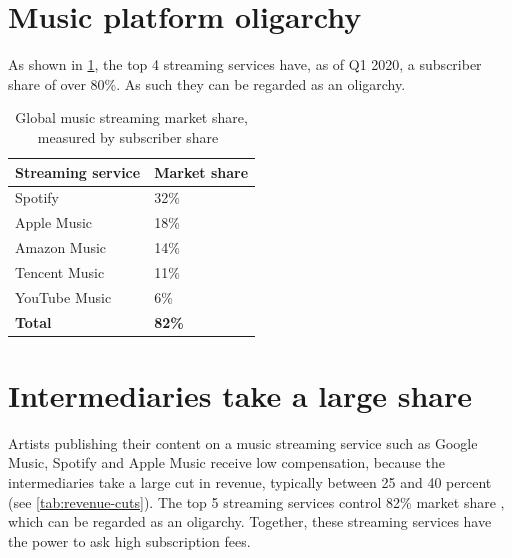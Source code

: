 

\section{Music platform oligarchy}
As shown in \ref{tab:streaming-service-market-share}, the top 4 streaming services have, as of Q1 2020, a subscriber share of over 80\%. As such they can be regarded as an oligarchy.
\begin{table}[]
\begin{tabular}{|l|l|}
\hline
\textbf{Streaming service} & \textbf{Market share} \\ \hline
Spotify                    & 32\%                  \\ \hline
Apple Music                & 18\%                  \\ \hline
Amazon Music               & 14\%                  \\ \hline
Tencent Music              & 11\%                  \\ \hline
YouTube Music              & 6\%                   \\ \hline
\textbf{Total}             & \textbf{82\%}         \\ \hline
\end{tabular}
\caption{Global music streaming market share, measured by subscriber share~\citep{midiamarketshare2020}}
\label{tab:streaming-service-market-share}
\end{table}

\section{Intermediaries take a large share}
Artists publishing their content on a music streaming service such as Google Music, Spotify and Apple Music receive low compensation, because the intermediaries take a large cut in revenue, typically between 25 and 40 percent (see \ref{tab:revenue-cuts}). The top 5 streaming services control 82\% market share \citep{midiamarketshare2020}, which can be regarded as an oligarchy. Together, these streaming services have the power to ask high subscription fees.

